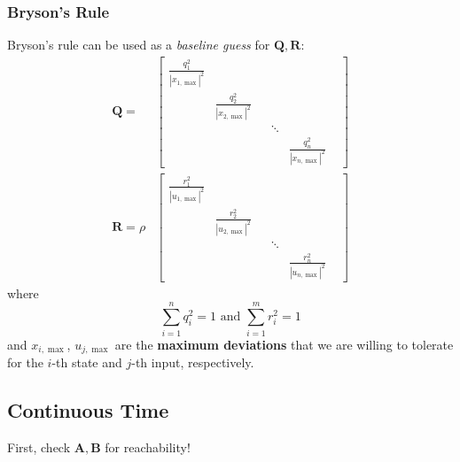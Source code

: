 \subsubsection{Bryson's Rule}
Bryson's rule can be used as a \textit{baseline guess} for $\mathbf{Q,R}$:
\noindent\begin{align*}
    \mathbf{Q} =
     & \begin{bmatrix}\frac{q_1^2}{|x_{1,\max}|^2} &                              &  &        &                              & \\
                                            & \frac{q_2^2}{|x_{2,\max}|^2} &  &        &                              & \\
                                            &                              &  & \ddots &                              & \\
                                            &                              &  &        & \frac{q_n^2}{|x_{n,\max}|^2}
       \end{bmatrix} \\
    \mathbf{R} = \rho
     & \begin{bmatrix}\frac{r_1^2}{|u_{1,\max}|^2} &                              &  &        &                              & \\
                                            & \frac{r_2^2}{|u_{2,\max}|^2} &  &        &                              & \\
                                            &                              &  & \ddots &                              & \\
                                            &                              &  &        & \frac{r_n^2}{|u_{n,\max}|^2}
       \end{bmatrix}
\end{align*}
where
\noindent\begin{equation*}
    \sum_{i=1}^n q_i^2=1\text{ and }\sum_{i=1}^m r_i^2=1
\end{equation*}
and $x_{i,\max}$, $u_{j,\max}$ are the \textbf{maximum deviations} that we are willing to tolerate for the $i$-th state and $j$-th input, respectively.

\subsection{Continuous Time}
First, check $\mathbf{A,B}$ for reachability!

